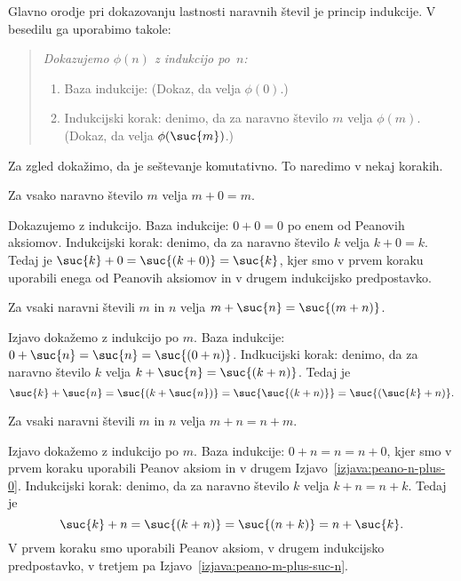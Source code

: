 Glavno orodje pri dokazovanju lastnosti naravnih števil je princip
indukcije. V besedilu ga uporabimo takole:
%
\begin{quote}
  \em
  Dokazujemo $\phi(n)$ z indukcijo po~$n$:
  \begin{enumerate}
    \item Baza indukcije: (Dokaz, da velja $\phi(0)$.)
    \item Indukcijski korak: denimo, da za naravno število $m$ velja
      $\phi(m)$. (Dokaz, da velja $\phi(\suc{m})$.)
  \end{enumerate}
\end{quote}
%
Za zgled dokažimo, da je seštevanje komutativno. To naredimo v nekaj
korakih.

\begin{izjava}
  \label{izjava:peano-n-plus-0}
  Za vsako naravno število $m$ velja $m + 0 = m$.
\end{izjava}

\begin{dokaz}
  Dokazujemo z indukcijo. Baza indukcije: $0 + 0 = 0$ po enem od
  Peanovih aksiomov.
  Indukcijski korak: denimo, da za naravno število $k$ velja $k + 0 =
  k$. Tedaj je $\suc{k} + 0 = \suc{(k + 0)} = \suc{k}$, kjer smo v
  prvem koraku uporabili enega od Peanovih aksiomov in v drugem
  indukcijsko predpostavko.
\end{dokaz}


\begin{izjava}
  \label{izjava:peano-m-plus-suc-n}
  Za vsaki naravni števili $m$ in $n$ velja $m + \suc{n} = \suc{(m + n)}$.
\end{izjava}

\begin{dokaz}
  Izjavo dokažemo z indukcijo po $m$.
  Baza indukcije: $0 + \suc{n} = \suc{n} = \suc{(0 + n)}$.
  Indkucijski korak: denimo, da za naravno število $k$ velja $k +
  \suc{n} = \suc{(k + n)}$. Tedaj je
  \begin{equation*}
    \suc{k} + \suc{n} = 
    \suc{(k + \suc{n})} =
    \suc{{\suc{(k + n)}}} =
    \suc{(\suc{k} + n)}.
  \end{equation*}
\end{dokaz}

\begin{izjava}
  Za vsaki naravni števili $m$ in $n$ velja $m + n = n + m$.
\end{izjava}

\begin{dokaz}
  Izjavo dokažemo z indukcijo po $m$.
  Baza indukcije: $0 + n = n = n + 0$, kjer smo v prvem koraku uporabili Peanov aksiom in v drugem Izjavo~\ref{izjava:peano-n-plus-0}.
  Indukcijski korak: denimo, da za naravno število $k$ velja $k + n = n + k$. Tedaj je
  \begin{equation*}
    \suc{k} + n =
    \suc{(k + n)} =
    \suc{(n + k)} =
    n + \suc{k}.
  \end{equation*}
  V prvem koraku smo uporabili Peanov aksiom, v drugem indukcijsko predpostavko, v tretjem pa Izjavo~\ref{izjava:peano-m-plus-suc-n}.
\end{dokaz}


